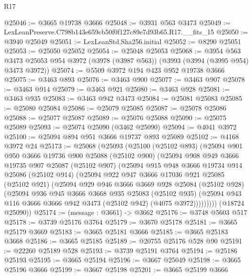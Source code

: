 \begin{lexlean}{R17}
\begin{coremodule}
@25046 := @3665 @19738 @3666
@25048 := @3931 @563 @3473
@25049 := LexLeanPreserve.C798b143e659cb50f0f127c89e7d93b65.R17.__fits_15
@25050 := @3940 @25049
@25051 := LexLeanStd.Sha256.initial
@25052 := @8290 @25051
@25053 := @25050 @25052
@25054 := @25048 @25053
@25068 := @3954
    @563
    @3473
    @25053
    @954
    @3972
    (@3978 (@3987 @563))
    (@3993 (@3994 (@3995 @954) @3473 @3972))
@25074 := @5509 @3972 @194 @423 @952 @19738 @3666
@25075 := @3463 @893
@25076 := @3463 @900
@25077 := @3463 @907
@25078 := @3463 @914
@25079 := @3463 @921
@25080 := @3463 @928
@25081 := @3463 @935
@25083 := @3463 @942 @3473
@25084 := @25081 @25083
@25085 := @25080 @25084
@25086 := @25079 @25085
@25087 := @25078 @25086
@25088 := @25077 @25087
@25089 := @25076 @25088
@25090 := @25075 @25089
@25093 := @25074 @25090 (@3462 @25090)
@25094 := @4041 @3972
@25100 := @25094 @894 @951 @3666 @19737 @893 @25089
@25102 := @4168 @3972 @24
@25173 := @25068
    (@25093
      (@25100
        (@25102 @893)
        (@25094
          @901
          @950
          @3666
          @19736
          @900
          @25088
          (@25102 @900)
          (@25094
            @908
            @949
            @3666
            @19735
            @907
            @25087
            (@25102 @907)
            (@25094
              @915
              @948
              @3666
              @19734
              @914
              @25086
              (@25102 @914)
              (@25094
                @922
                @947
                @3666
                @17036
                @921
                @25085
                (@25102 @921)
                (@25094
                  @929
                  @946
                  @3666
                  @3669
                  @928
                  @25084
                  (@25102 @928)
                  (@25094
                    @936
                    @945
                    @3666
                    @3668
                    @935
                    @25083
                    (@25102 @935)
                    (@25094 @943 @116 @3666 @3666 @942 @3473 (@25102 @942) (@4075 @3972)))))))))
      (@18724 @25090))
@25174 := (message : @3661) -> @3662
@25176 := @3748 @5603 @517
@25178 := @3739 @25176 @3764
@25179 := @3670 @25178
@25181 := @3665 @25179 @3669
@25183 := @3665 @25181 @3666
@25185 := @3665 @25183 @3668
@25186 := @3665 @25185
@25189 := @20755 @25176 @528 @90
@25191 := @22260 @25189 @528
@25193 := @3739 @25191 @3764
@25194 := @25186 @25193
@25195 := @3665 @25194
@25196 := @3667 @25049
@25198 := @3665 @25196 @3666
@25199 := @3667 @25198
@25201 := @3665 @25199 @3666

\end{coremodule}
\end{lexlean}
